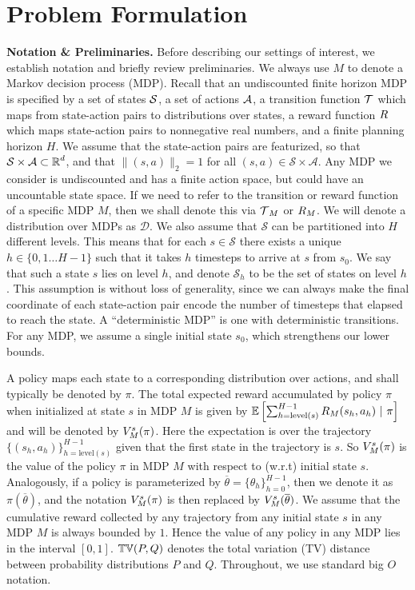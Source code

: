 \documentclass[11pt,twoside]{article}
\begin{document}
\section{Problem Formulation}
\label{sec:prob_form}
\textbf{Notation \& Preliminaries.} Before describing our settings of interest, we establish notation and briefly review preliminaries. We always use $M$ to denote a Markov decision process (MDP). Recall that an undiscounted finite horizon MDP is specified by a set of states $\operatorname{\mathcal{S}}$, a set of actions $\operatorname{\mathcal{A}}$, a transition function $\operatorname{\mathcal{T}}$ which maps from state-action pairs to distributions over states, a reward function $R$ which maps state-action pairs to nonnegative real numbers, and a finite planning horizon $H$. We assume that the state-action pairs are featurized, so that $\mathcal{S} \times \mathcal{A} \subset \operatorname{\mathbb{R}}^d$, and that $\| (s, a) \|_2 = 1$ for all $(s, a) \in \mathcal{S} \times \mathcal{A}$. Any MDP we consider is undiscounted and has a finite action space, but could have an uncountable state space. If we need to refer to the transition or reward function of a specific MDP $M$, then we shall denote this via $\operatorname{\mathcal{T}}_M$ or $R_M$. We will denote a distribution over MDPs as $\mathcal{D}$. We also assume that $\mathcal{S}$ can be partitioned into $H$ different levels. This means that for each $s \in \mathcal{S}$ there exists a unique $h \in \{ 0, 1 \dots H-1 \}$ such that it takes $h$ timesteps to arrive at $s$ from $s_0$. We say that such a state $s$ lies on level $h$, and denote $\mathcal{S}_h$ to be the set of states on level $h$. This assumption is without loss of generality, since we can always make the final coordinate of each state-action pair encode the number of timesteps that elapsed to reach the state. A ``deterministic MDP'' is one with deterministic transitions. For any MDP, we assume a single initial state $s_0$, which strengthens our lower bounds.

A policy maps each state to a corresponding distribution over actions, and shall typically be denoted by $\pi$. The total expected reward accumulated by policy $\pi$ when initialized at state $s$ in MDP $M$ is given by $\operatorname{\mathbb{E}} \left[ \sum_{h=\text{level}(s)}^{H-1} R_M(s_h, a_h)~\vert~\pi \right]$ and will be denoted by $V^{{s }}_{{M }}({\pi})$. Here the expectation is over the trajectory $\{ (s_h, a_h) \}_{h = \text{level}(s)}^{H-1}$ given that the first state in the trajectory is $s$. So $V^{{s }}_{{M }}({\pi})$ is the value of the policy $\pi$ in MDP $M$ with respect to (w.r.t) initial state $s$. Analogously, if a policy is parameterized by $\overline{\theta} = \{ \theta_h \}_{h=0}^{H-1}$, then we denote it as $\pi(\overline{\theta})$, and the notation $V^{{s }}_{{M }}({\pi})$ is then replaced by $V^{{s }}_{{M }}({\overline{\theta}})$. We assume that the cumulative reward collected by any trajectory from any initial state $s$ in any MDP $M$ is always bounded by $1$. Hence the value of any policy in any MDP lies in the interval $[0,1]$. $\operatorname{\mathbb{TV}}(P, Q)$ denotes the total variation (TV) distance between probability distributions $P$ and $Q$. Throughout, we use standard big $O$ notation.
\end{document}
